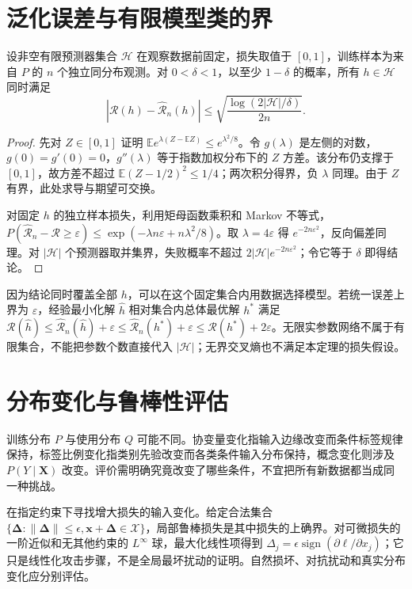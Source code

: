 \documentclass[UTF8,12pt,a4paper,fontset=fandol]{ctexbook}
\begin{document}
\section{泛化误差与有限模型类的界}
\begin{theorem}[有限模型类的一致界]
设非空有限预测器集合 $\mathcal H$ 在观察数据前固定，损失取值于 $[0,1]$，训练样本为来自 $P$ 的 $n$ 个独立同分布观测。对 $0<\delta<1$，以至少 $1-\delta$ 的概率，所有 $h\in\mathcal H$ 同时满足
\begin{equation}
|\mathcal R(h)-\widehat{\mathcal R}_n(h)|\leq
\sqrt{\frac{\log(2|\mathcal H|/\delta)}{2n}}.
\label{eq:dl-finite-generalization}
\end{equation}
\end{theorem}
\begin{proof}
先对 $Z\in[0,1]$ 证明 $\mathbb E e^{\lambda(Z-\mathbb EZ)}\leq e^{\lambda^2/8}$。令 $g(\lambda)$ 是左侧的对数，$g(0)=g'(0)=0$，$g''(\lambda)$ 等于指数加权分布下的 $Z$ 方差。该分布仍支撑于 $[0,1]$，故方差不超过 $\mathbb E(Z-1/2)^2\leq1/4$；两次积分得界，负 $\lambda$ 同理。由于 $Z$ 有界，此处求导与期望可交换。

对固定 $h$ 的独立样本损失，利用矩母函数乘积和 Markov 不等式，$P(\widehat{\mathcal R}_n-\mathcal R\geq\varepsilon)\leq\exp(-\lambda n\varepsilon+n\lambda^2/8)$。取 $\lambda=4\varepsilon$ 得 $e^{-2n\varepsilon^2}$，反向偏差同理。对 $|\mathcal H|$ 个预测器取并集界，失败概率不超过 $2|\mathcal H|e^{-2n\varepsilon^2}$；令它等于 $\delta$ 即得结论。
\end{proof}
因为结论同时覆盖全部 $h$，可以在这个固定集合内用数据选择模型。若统一误差上界为 $\varepsilon$，经验最小化解 $\widehat h$ 相对集合内总体最优解 $h^*$ 满足 $\mathcal R(\widehat h)\leq\widehat{\mathcal R}_n(\widehat h)+\varepsilon\leq\widehat{\mathcal R}_n(h^*)+\varepsilon\leq\mathcal R(h^*)+2\varepsilon$。无限实参数网络不属于有限集合，不能把参数个数直接代入 $|\mathcal H|$；无界交叉熵也不满足本定理的损失假设。

\section{分布变化与鲁棒性评估}
训练分布 $P$ 与使用分布 $Q$ 可能不同。协变量变化指输入边缘改变而条件标签规律保持，标签比例变化指类别先验改变而各类条件输入分布保持，概念变化则涉及 $P(Y\mid\mathbf X)$ 改变。评价需明确究竟改变了哪些条件，不宜把所有新数据都当成同一种挑战。

在指定约束下寻找增大损失的输入变化。给定合法集合 $\{\boldsymbol\Delta:\|\boldsymbol\Delta\|\leq\epsilon,\mathbf x+\boldsymbol\Delta\in\mathcal X\}$，局部鲁棒损失是其中损失的上确界。对可微损失的一阶近似和无其他约束的 $L^\infty$ 球，最大化线性项得到 $\Delta_j=\epsilon\operatorname{sign}(\partial\ell/\partial x_j)$；它只是线性化攻击步骤，不是全局最坏扰动的证明。自然损坏、对抗扰动和真实分布变化应分别评估。
\end{document}
